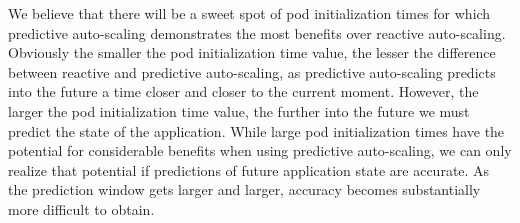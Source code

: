 We believe that there will be a sweet spot of pod initialization times
for which predictive auto-scaling demonstrates the most benefits over reactive
auto-scaling. Obviously the smaller the pod initialization time value, the lesser
the difference between reactive and predictive auto-scaling, as predictive
auto-scaling predicts into the future a time closer and closer to the current
moment. However, the larger the pod initialization time value, the further into
the future we must predict the state of the application. While large pod
initialization times have the potential for considerable benefits when using
predictive auto-scaling, we can only realize that potential if predictions of
future application state are accurate. As the prediction window gets larger and
larger, accuracy becomes substantially more difficult to obtain.
